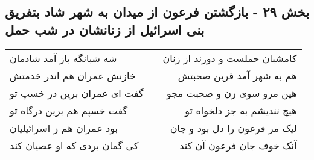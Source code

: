\begin{center}
\section*{بخش ۲۹ - بازگشتن فرعون از میدان به شهر شاد بتفریق  بنی اسرائیل از زنانشان در شب حمل}
\label{sec:sh029}
\begin{longtable}{l p{0.5cm} r}
شه شبانگه باز آمد شادمان
&&
کامشبان حملست و دورند از زنان
\\
خازنش عمران هم اندر خدمتش
&&
هم به شهر آمد قرین صحبتش
\\
گفت ای عمران برین در خسپ تو
&&
هین مرو سوی زن و صحبت مجو
\\
گفت خسپم هم برین درگاه تو
&&
هیچ نندیشم به جز دلخواه تو
\\
بود عمران هم ز اسرائیلیان
&&
لیک مر فرعون را دل بود و جان
\\
کی گمان بردی که او عصیان کند
&&
آنک خوف جان فرعون آن کند
\\
\end{longtable}
\end{center}
